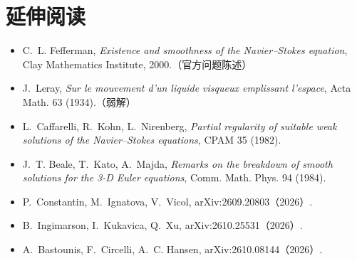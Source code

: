 \documentclass[11pt,a4paper]{article}
\begin{document}
\section*{延伸阅读}
\begin{itemize}[leftmargin=1.6em]
\item C.~L. Fefferman, \emph{Existence and smoothness of the Navier--Stokes equation},
      Clay Mathematics Institute, 2000.（官方问题陈述）
\item J.~Leray, \emph{Sur le mouvement d'un liquide visqueux emplissant l'espace},
      Acta Math. 63 (1934).（弱解）
\item L.~Caffarelli, R.~Kohn, L.~Nirenberg, \emph{Partial regularity of suitable weak
      solutions of the Navier--Stokes equations}, CPAM 35 (1982).
\item J.~T. Beale, T.~Kato, A.~Majda, \emph{Remarks on the breakdown of smooth solutions
      for the 3-D Euler equations}, Comm. Math. Phys. 94 (1984).
\item P.~Constantin, M.~Ignatova, V.~Vicol, arXiv:2609.20803（2026）.
\item B.~Ingimarson, I.~Kukavica, Q.~Xu, arXiv:2610.25531（2026）.
\item A.~Bastounis, F.~Circelli, A.~C. Hansen, arXiv:2610.08144（2026）.
\end{itemize}
\end{document}
